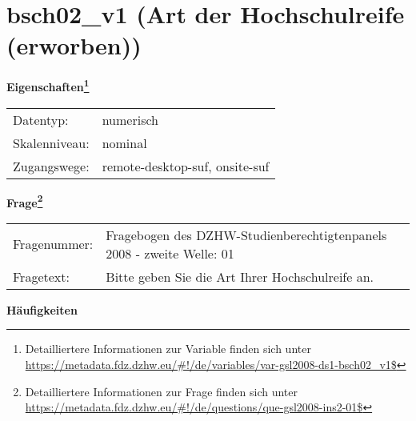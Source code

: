 
    \setcounter{footnote}{0}

    \vspace*{-1.8cm}
	\section{bsch02\_v1 (Art der Hochschulreife (erworben))}
	\label{section:bsch02_v1}



    \vspace*{0.5cm}
    \noindent\textbf{Eigenschaften\footnote{Detailliertere Informationen zur Variable finden sich unter
		\url{https://metadata.fdz.dzhw.eu/\#!/de/variables/var-gsl2008-ds1-bsch02_v1$}}}\\
	\begin{tabularx}{\hsize}{@{}lX}
	Datentyp: & numerisch \\
	Skalenniveau: & nominal \\
	Zugangswege: &
	  remote-desktop-suf, 
	  onsite-suf
 \\
    \end{tabularx}



				\vspace*{0.5cm}
                \noindent\textbf{Frage\footnote{Detailliertere Informationen zur Frage finden sich unter
		              \url{https://metadata.fdz.dzhw.eu/\#!/de/questions/que-gsl2008-ins2-01$}}}\\
				\begin{tabularx}{\hsize}{@{}lX}
					Fragenummer: &
					  Fragebogen des DZHW-Studienberechtigtenpanels 2008 - zweite Welle:
					  01
 \\
					Fragetext: & Bitte geben Sie die Art Ihrer Hochschulreife an. \\
				\end{tabularx}





        		\vspace*{0.5cm}
                \noindent\textbf{Häufigkeiten}


